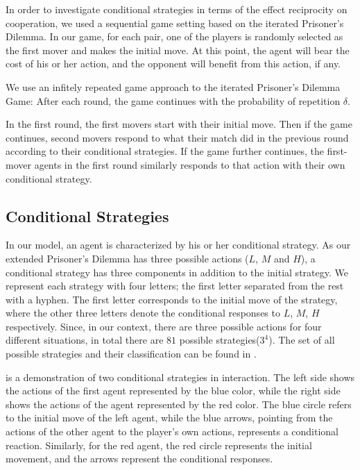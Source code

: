 \documentclass[12pt]{article}
\begin{document}
In order to investigate conditional strategies in terms of the effect reciprocity on cooperation, we used a sequential game setting based on the iterated Prisoner's Dilemma. In our game, for each pair, one of the players is randomly selected as the first mover and makes the initial move. At this point, the agent will bear the cost of his or her action, and the opponent will benefit from this action, if any. 

We use an infitely repeated game approach to the iterated Prisoner's Dilemma Game: After each round, the game continues with the probability of repetition $\delta$. 

In the first round, the first movers start with their initial move. Then if the game continues, second movers respond to what their match did in the previous round according to their conditional strategies. If the game further continues, the first-mover agents in the first round similarly responds to that action with their own conditional strategy. 

\subsection{Conditional Strategies}
In our model, an agent is characterized by his or her conditional strategy. As our extended Prisoner's Dilemma has three possible actions ($L$, $M$ and $H$), a conditional strategy has three components in addition to the initial strategy. We represent each strategy with four letters; the first letter separated from the rest with a hyphen. The first letter corresponds to the initial move of the strategy, where the other three letters denote the conditional responses to $L$, $M$, $H$ respectively. Since, in our context, there are three possible actions for four different situations, in total there are $81$ possible strategies($3^4$). The set of all possible strategies and their classification can be found in .

  is a demonstration of two conditional strategies in interaction. The left side shows the actions of the first agent represented by the blue color, while the right side shows the actions of the agent represented by the red color. The blue circle refers to the initial move of the left agent, while the blue arrows, pointing from the actions of the other agent to the player's own actions, represents a conditional reaction. Similarly, for the red agent, the red circle represents the initial movement, and the arrows represent the conditional responses.
\end{document}
